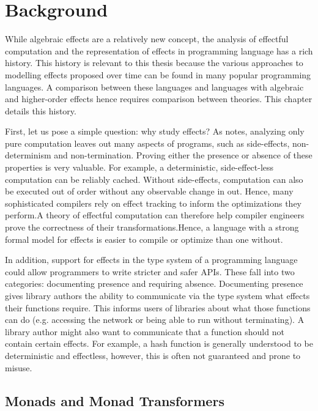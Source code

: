 \chapter{Background}\label{chap:background}

While algebraic effects are a relatively new concept, the analysis of effectful computation and the representation of effects in programming language has a rich history. This history is relevant to this thesis because the various approaches to modelling effects proposed over time can be found in many popular programming languages. A comparison between these languages and languages with algebraic and higher-order effects hence requires comparison between theories. This chapter details this history.

First, let us pose a simple question: why study effects? As \textcite{moggi_computational_1989} notes, analyzing only pure computation leaves out many aspects of programs, such as side-effects, non-determinism and non-termination. Proving either the presence or absence of these properties is very valuable. For example, a deterministic, side-effect-less computation can be reliably cached. Without side-effects, computation can also be executed out of order without any observable change in out. Hence, many sophisticated compilers rely on effect tracking to inform the optimizations they perform.\citationneeded A theory of effectful computation can therefore help compiler engineers prove the correctness of their transformations.\citationneeded Hence, a language with a strong formal model for effects is easier to compile or optimize than one without.

In addition, support for effects in the type system of a programming language could allow programmers to write stricter and safer APIs. These fall into two categories: documenting\reword{} presence and requiring absence. Documenting presence gives library authors the ability to communicate via the type system what effects their functions require. This informs users of libraries about what those functions can do (e.g. accessing the network or being able to run without terminating). A library author might also want to communicate that a function should not contain certain effects. For example, a hash function is generally understood to be deterministic and effectless, however, this is often not guaranteed and prone to misuse.

\section{Monads and Monad Transformers}

